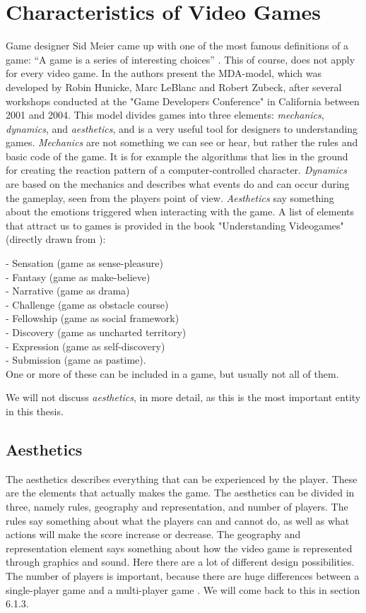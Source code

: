 \chapter{Characteristics of Video Games}
Game designer Sid Meier came up with one of the most famous definitions of a game: “A game is a series of interesting choices” \cite{understandingvg}. This of course, does not apply for every video game. In \cite{understandingvg} the authors present the MDA-model, which was developed by Robin Hunicke, Marc LeBlanc and Robert Zubeck, after several workshops conducted at the "Game Developers Conference" in California between 2001 and 2004. This model divides games into three elements: \emph{mechanics}, \emph{dynamics}, and \emph{aesthetics}, and is a very useful tool for designers to understanding games. \emph{Mechanics} are not something we can see or hear, but rather the rules and basic code of the game. It is for example the algorithms that lies in the ground for creating the reaction pattern of a computer-controlled character. \emph{Dynamics} are based on the mechanics and describes what events do and can occur during the gameplay, seen from the players point of view. \emph{Aesthetics} say something about the emotions triggered when interacting with the game. A list of elements  that attract us to games is provided in the book "Understanding Videogames" (directly drawn from \cite{understandingvg}): 

- Sensation (game as sense-pleasure)\\
- Fantasy (game as make-believe)\\
- Narrative (game as drama)\\
- Challenge (game as obstacle course)\\
- Fellowship (game as social framework)\\
- Discovery (game as uncharted territory)\\
- Expression (game as self-discovery)\\
- Submission (game as pastime).\\
One or more of these can be included in a game, but usually not all of them.

We will not discuss \emph{aesthetics}, in more detail, as this is the most important entity in this thesis. 

\section{Aesthetics}
The aesthetics describes everything that can be experienced by the player. These are the elements that actually makes the game. The aesthetics can be divided in three, namely rules, geography and representation, and number of players. The rules say something about what the players can and cannot do, as well as what actions will make the score increase or decrease. The geography and representation element says something about how the video game is represented through graphics and sound. Here there are a lot of different design possibilities. The number of players is important, because there are huge differences between a single-player game and a multi-player game \cite{understandingvg}. We will come back to this in section 6.1.3. 

